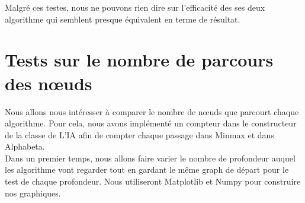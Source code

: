 \documentclass[a4paper,12pt]{article} %
\begin{document}
Malgré ces testes, nous ne pouvons rien dire sur l'efficacité des ses deux algorithme qui semblent presque équivalent en terme de résultat.

\section{Tests sur le nombre de parcours des nœuds}

Nous allons nous intéresser à comparer le nombre de nœuds que parcourt chaque algorithme. Pour cela, nous avons implémenté un compteur dans le constructeur de la classe de L'IA afin de compter chaque passage dans Minmax et dans Alphabeta.\\

Dans un premier temps, nous allons faire varier le nombre de profondeur auquel les algorithme vont regarder tout en gardant le même graph de départ pour le test de chaque profondeur. Nous utiliseront Matplotlib et Numpy pour construire nos graphiques.
\end{document}
